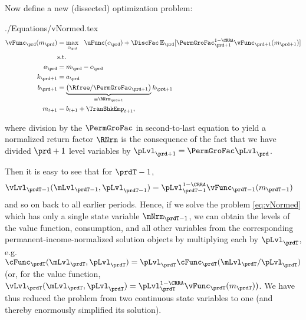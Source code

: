 \documentclass[SolvingMicroDSOPs]{subfiles}
\begin{document}
Now define a new (dissected) optimization problem:
\begin{verbatimwrite}{./Equations/vNormed.tex}
  \begin{equation}\begin{gathered}\begin{aligned}
        {\vFunc}_{\prd}({m}_{\prd}) & = \max_{{c}_{\prd}} ~~ \uFunc({c}_{\prd})+
        {\DiscFac}\Ex_{\prd}[ \PermGroFac_{\prd+1}^{1-\CRRA}{\vFunc}_{\prd+1}({m}_{\prd+1})] \label{eq:vNormed}                   \\
                                         & \text{s.t.}                                                                                 \\
        {a}_{\prd}                       & = {m}_{\prd}-{c}_{\prd}                                                                     \\
        {k}_{\prd+1}                     & = {a}_{\prd}                                                                                \\
        {b}_{\prd+1}                     & = \underbrace{\left(\Rfree/\PermGroFac_{\prd+1}\right)}_{\equiv \RNrm_{\prd+1}}{k}_{\prd+1} \\
        {m}_{t+1}                        & = {b}_{t+1}+\TranShkEmp_{t+1},
      \end{aligned}\end{gathered}\end{equation}
\end{verbatimwrite}
\unskip
where division by the $\PermGroFac$ in second-to-last equation to yield a normalized return factor $\RNrm$ is the consequence of the fact that we have divided $\prd+1$ level variables by $\pLvl_{\prd+1}=\PermGroFac\pLvl_{\prd}$.

Then it is easy to see that for $\prdT-1$, 
\begin{equation*}\begin{gathered}\begin{aligned}
      {\vLvl}_{\prdT-1}(\mLvl_{\prdT-1},\pLvl_{\prdT-1}) & =  \pLvl_{\prdT-1}^{1-\CRRA}{\vFunc}_{\prdT-1}({m}_{\prdT-1})
    \end{aligned}\end{gathered}\end{equation*}
and so on back to all earlier periods.  Hence, if we solve the problem \eqref{eq:vNormed} which has only a single state variable $\mNrm_{\prdT-1}$, we can obtain the levels of the value function, consumption, and all other variables from the corresponding permanent-income-normalized solution objects by multiplying each by $\pLvl_{\prdT}$, e.g.\ ${\cFunc}_{\prdT}(\mLvl_{\prdT},\pLvl_{\prdT})=\pLvl_{\prdT}\cFunc_{\prdT}(\mLvl_{\prdT}/\pLvl_{\prdT})$ (or, for the value function, ${\vLvl} _{\prdT}({\mLvl}_{\prdT},\pLvl_{\prdT}) = \pLvl_{\prdT}^{1-\CRRA}\vFunc_{\prdT}({m}_{\prdT}))$.  We have thus reduced the problem from two continuous state variables to one (and thereby enormously simplified its solution).
\end{document}
